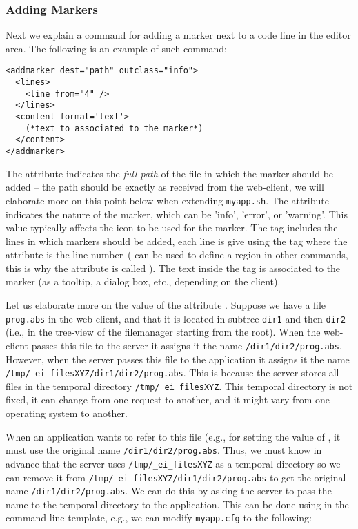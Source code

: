 \subsubsection{Adding Markers}

Next we explain a command for adding a marker next to a code line in
the editor area. The following is an example of such command:

\medskip
\begin{lstlisting}
<addmarker dest="path" outclass="info">
  <lines>
    <line from="4" />
  </lines>
  <content format='text'>
    (*text to associated to the marker*)
  </content>
</addmarker>
\end{lstlisting}

\medskip
\noindent
The attribute  indicates the \emph{full path} of the file in
which the marker should be added -- the path should be exactly as
received from the web-client, we will elaborate more on this point
below when extending \texttt{myapp.sh}.
%
The attribute  indicates the nature of the marker, which
can be 'info', 'error', or 'warning'. This value typically affects the
icon to be used for the marker.
%
The tag  includes the lines in which markers should be
added, each line is give using the tag  where the 
attribute is the line number~( can be used to define a
region in other commands, this is why the attribute is called
).
%
The text inside the  tag is associated to the marker (as
a tooltip, a dialog box, etc., depending on the client).

Let us elaborate more on the value of the attribute
. Suppose we have a file \texttt{prog.abs} in the
web-client, and that it is located in subtree \texttt{dir1} and then
\texttt{dir2} (i.e., in the tree-view of the filemanager starting from
the root).
%
When the web-client passes this file to the server it assigns it the
name \texttt{/dir1/dir2/prog.abs}. However, when the server passes
this file to the application it assigns it the name
\texttt{/tmp/\_ei\_filesXYZ/dir1/dir2/prog.abs}. 
%
This is because the server stores all files in the temporal directory
\texttt{/tmp/\_ei\_filesXYZ}. This temporal directory is not fixed, it
can change from one request to another, and it might vary from one
operating system to another.

When an application wants to refer to this file (e.g., for setting the
value of , it must use the original name
\texttt{/dir1/dir2/prog.abs}.
%
Thus, we must know in advance that the server uses
\texttt{/tmp/\_ei\_filesXYZ} as a temporal directory so we can remove
it from \texttt{/tmp/\_ei\_filesXYZ/dir1/dir2/prog.abs} to get the
original name \texttt{/dir1/dir2/prog.abs}. 
%
We can do this by asking the server to pass the name to the temporal
directory to the application. This can be done using  in
the command-line template, e.g., we can modify \texttt{myapp.cfg} to
the following:

